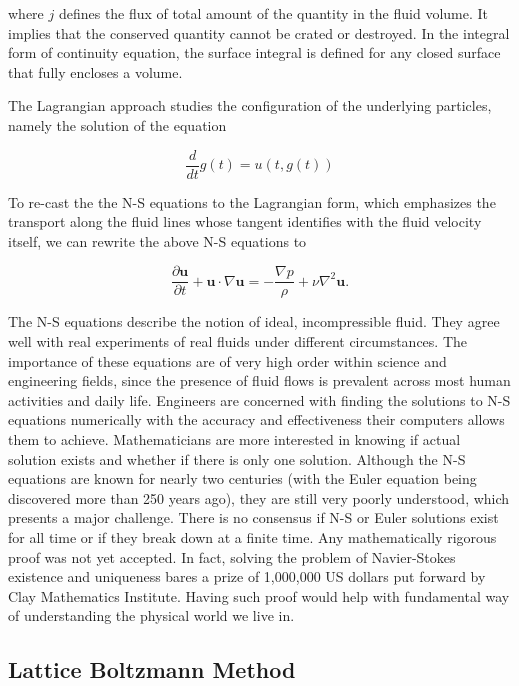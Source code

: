 where $j$ defines the flux of total amount of the quantity in the fluid volume. It implies that the conserved quantity cannot be crated or destroyed. In the integral form of continuity equation, the surface integral is defined for any closed surface that fully encloses a volume. 

The Lagrangian approach studies the configuration of the underlying particles, namely the solution of the equation

\begin{equation} 
	\label{eqn:lagrange-hydro}
	\frac{d}{dt} g(t) = u(t, g(t))
\end{equation}

To re-cast the the N-S equations to the Lagrangian form, which emphasizes the transport along the fluid lines whose tangent identifies with the fluid velocity itself, we can rewrite the above N-S equations to

\begin{equation} 
	\label{eqn:lagrange-ns-modern}
	\frac{\partial \bm{u}}{\partial t} + \bm{u} \cdot \nabla \bm{u} = - \frac{\nabla p}{\rho} + \nu \nabla^2 \bm{u}.
\end{equation}

The N-S equations describe the notion of ideal, incompressible fluid. They agree well with real experiments of real fluids under different circumstances. The importance of these equations are of very high order within science and engineering fields, since the presence of fluid flows is prevalent across most human activities and daily life. Engineers are concerned with finding the solutions to N-S equations numerically with the accuracy and effectiveness their computers allows them to achieve. Mathematicians are more interested in knowing if actual solution exists and whether if there is only one solution. Although the N-S equations are known for nearly two centuries (with the Euler equation being discovered more than 250 years ago), they are still very poorly understood, which presents a major challenge. There is no consensus if N-S or Euler solutions exist for all time or if they break down at a finite time. Any mathematically rigorous proof was not yet accepted. In fact, solving the problem of Navier-Stokes existence and uniqueness bares a prize of 1,000,000 US dollars put forward by Clay Mathematics Institute. Having such proof would help with fundamental way of understanding the physical world we live in.

\subsection{Lattice Boltzmann Method}


